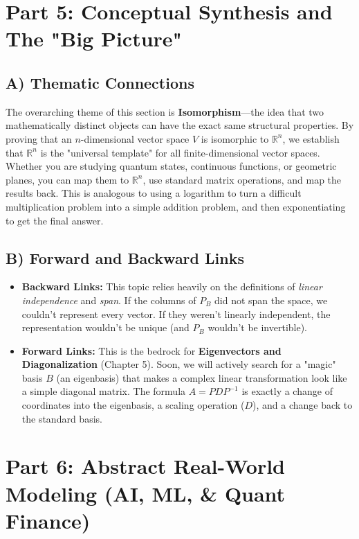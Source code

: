 \documentclass[11pt]{article}
\begin{document}
\newpage
\section{Part 5: Conceptual Synthesis and The "Big Picture"}

\subsection{A) Thematic Connections}
The overarching theme of this section is \textbf{Isomorphism}—the idea that two mathematically distinct objects can have the exact same structural properties. By proving that an $n$-dimensional vector space $V$ is isomorphic to $\mathbb{R}^n$, we establish that $\mathbb{R}^n$ is the "universal template" for all finite-dimensional vector spaces. Whether you are studying quantum states, continuous functions, or geometric planes, you can map them to $\mathbb{R}^n$, use standard matrix operations, and map the results back. This is analogous to using a logarithm to turn a difficult multiplication problem into a simple addition problem, and then exponentiating to get the final answer.

\subsection{B) Forward and Backward Links}
\begin{itemize}
    \item \textbf{Backward Links:} This topic relies heavily on the definitions of \textit{linear independence} and \textit{span}. If the columns of $P_B$ did not span the space, we couldn't represent every vector. If they weren't linearly independent, the representation wouldn't be unique (and $P_B$ wouldn't be invertible).
    \item \textbf{Forward Links:} This is the bedrock for \textbf{Eigenvectors and Diagonalization} (Chapter 5). Soon, we will actively search for a "magic" basis $B$ (an eigenbasis) that makes a complex linear transformation look like a simple diagonal matrix. The formula $A = P D P^{-1}$ is exactly a change of coordinates into the eigenbasis, a scaling operation ($D$), and a change back to the standard basis.
\end{itemize}

\newpage
\section{Part 6: Abstract Real-World Modeling (AI, ML, \& Quant Finance)}
\end{document}
